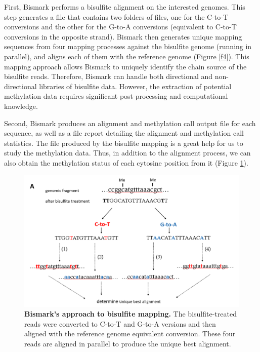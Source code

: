 \documentclass{PHlab-thesis}
\begin{document}
\par
First, Bismark performs a bisulfite alignment on the interested genomes. This step generates a file that contains two folders of files, one for the C-to-T conversions and the other for the G-to-A conversions (equivalent to C-to-T conversions in the opposite strand). Bismark then generates unique mapping sequences from four mapping processes against the bisulfite genome (running in parallel), and aligns each of them with the reference genome (Figure \ref{f4}). This mapping approach allows Bismark to uniquely identify the chain source of the bisulfite reads. Therefore, Bismark can handle both directional and non-directional libraries of bisulfite data. However, the extraction of potential methylation data requires significant post-processing and computational knowledge.

\par
Second, Bismark produces an alignment and methylation call output file for each sequence, as well as a file report detailing the alignment and methylation call statistics. The file produced by the bisulfite mapping is a great help for us to study the methylation data. Thus, in addition to the alignment process, we can also obtain the methylation status of each cytosine position from it (Figure \ref{f3}).

\begin{figure}[h!]
  \centering
  \includegraphics[scale=0.8]{figures/bismark-a.png}
  \caption{\textbf{Bismark’s approach to bisulfite mapping.}
  The bisulfite-treated reads were converted to C-to-T and G-to-A versions and then aligned with the reference genome equivalent conversion. These four reads are aligned in parallel to produce the unique best alignment.}
  \label{f3}
\end{figure}
\end{document}
